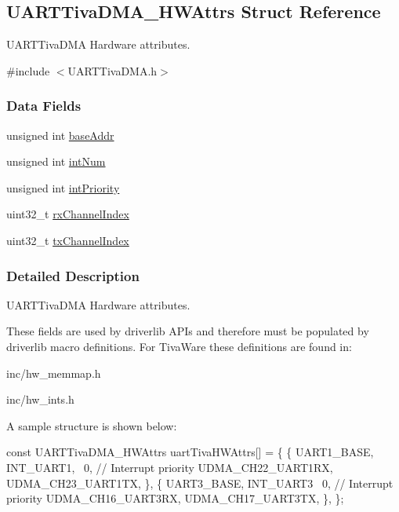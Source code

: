 \subsection{U\+A\+R\+T\+Tiva\+D\+M\+A\+\_\+\+H\+W\+Attrs Struct Reference}
\label{struct_u_a_r_t_tiva_d_m_a___h_w_attrs}


U\+A\+R\+T\+Tiva\+D\+M\+A Hardware attributes.  




{\ttfamily \#include $<$U\+A\+R\+T\+Tiva\+D\+M\+A.\+h$>$}

\subsubsection*{Data Fields}
\begin{DoxyCompactItemize}
\item 
unsigned int \hyperlink{struct_u_a_r_t_tiva_d_m_a___h_w_attrs_a0cee71a1b87b797dbf1e7660c1134611}{base\+Addr}
\item 
unsigned int \hyperlink{struct_u_a_r_t_tiva_d_m_a___h_w_attrs_af51acdaa385973204a6c5741e3e26f40}{int\+Num}
\item 
unsigned int \hyperlink{struct_u_a_r_t_tiva_d_m_a___h_w_attrs_a0b7002c09c1623fe01c4be22176cf611}{int\+Priority}
\item 
uint32\+\_\+t \hyperlink{struct_u_a_r_t_tiva_d_m_a___h_w_attrs_a0c35ca59f07ed055b768efb74d304db1}{rx\+Channel\+Index}
\item 
uint32\+\_\+t \hyperlink{struct_u_a_r_t_tiva_d_m_a___h_w_attrs_af4475ebe44ae2d17d0967c00266c586c}{tx\+Channel\+Index}
\end{DoxyCompactItemize}


\subsubsection{Detailed Description}
U\+A\+R\+T\+Tiva\+D\+M\+A Hardware attributes. 

These fields are used by driverlib A\+P\+Is and therefore must be populated by driverlib macro definitions. For Tiva\+Ware these definitions are found in\+:
\begin{DoxyItemize}
\item inc/hw\+\_\+memmap.\+h
\item inc/hw\+\_\+ints.\+h
\end{DoxyItemize}

A sample structure is shown below\+: 
\begin{DoxyCode}
\textcolor{keyword}{const} UARTTivaDMA_HWAttrs uartTivaHWAttrs[] = \{
    \{
        UART1\_BASE,
        INT\_UART1,
        ~0,        \textcolor{comment}{// Interrupt priority}
        UDMA\_CH22\_UART1RX,
        UDMA\_CH23\_UART1TX,
    \},
    \{
        UART3\_BASE,
        INT\_UART3
        ~0,        \textcolor{comment}{// Interrupt priority}
        UDMA\_CH16\_UART3RX,
        UDMA\_CH17\_UART3TX,
    \},
\};
\end{DoxyCode}
 

